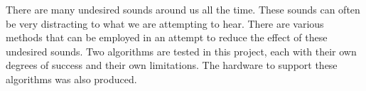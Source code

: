 \thispagestyle{plain}
There are many undesired sounds around us all the time.
These sounds can often be very distracting to what we are attempting to hear.
There are various methods that can be employed in an attempt to reduce the
effect of these undesired sounds.
Two algorithms are tested in this project, each with their own degrees of
success and their own limitations.
The hardware to support these algorithms was also produced.
